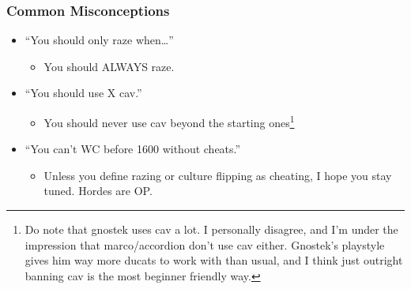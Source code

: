 \begin{frame}
  \frametitle{Common Misconceptions}
  \begin{itemize}
    \item ``You should only raze when\ldots''
    \begin{itemize}
      \item You should ALWAYS raze.
    \end{itemize}
    \item ``You should use X cav.''
    \begin{itemize}
      \item You should never use cav beyond the starting ones\footnote{Do note
          that gnostek uses cav a lot. I personally disagree, and I'm under the
          impression that marco/accordion don't use cav either. Gnostek's
          playstyle gives him way more ducats to work with than usual, and I
          think just outright banning cav is the most beginner friendly way.}
    \end{itemize}
    \item ``You can't WC before 1600 without cheats.''
    \begin{itemize}
      \item Unless you define razing or culture flipping as cheating, I hope you
        stay tuned. Hordes are OP.
    \end{itemize}
  \end{itemize}
\end{frame}
